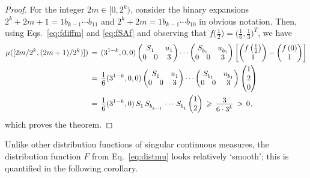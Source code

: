 \documentclass[11pt,a4paper]{amsart}
\theoremstyle{plain}
\theoremstyle{definition}
\numberwithin{equation}{section}
\newcommand{\ts}{\hspace{0.5pt}}
\newcommand{\myfrac}[2]{\frac{\raisebox{-2pt}{$#1$}}
      {\raisebox{0.5pt}{$#2$}}}
\begin{document}
\begin{proof}
For the integer $2m\in[0,2^{k})$, consider the binary expansions 
$2^k+2m+1=1b_{k-1}\cdots b_11$ and  $2^k+2m=1b_{k-1}\cdots
b_10$ in obvious notation. Then, using 
Eqs.~\eqref{eq:fdiffm} and \eqref{eq:fSAf} and
observing that $f \bigl( \frac{1}{2}\bigr) = \bigl(
\frac{1}{6}, \frac{1}{3} \bigr)^{T}$, we have
\begin{align*}
   \mu([2m/2^k, (2m+1)/2^k)]) \,
   &= \, (3^{1-k}, 0 , 0)\left(\begin{matrix} {S}^{}_{1} & 
   {u}^{}_{1}\\ 0\ \ \ 0 & 3 \end{matrix}\right)
   \cdots\left(\begin{matrix} {S}^{}_{b_{1}} & {u}^{}_{b_{1}}\\
    0\ \ \ 0 & 3 \end{matrix}\right)\left[\left(\begin{matrix}
    {f}\left(\frac{1}{2}\right)\\ 1\end{matrix}\right)-\left(
   \begin{matrix} {f}\left(0\right)\\ 1\end{matrix}\right)\right]\\
   &= \, \myfrac{1}{6}
   (3^{1-k}, 0 , 0)\left(\begin{matrix} {S}^{}_{1} & {u}^{}_{1}\\ 
   0\ \ \ 0 & 3 \end{matrix}\right)
   \cdots\left(\begin{matrix} {S}^{}_{b_{1}} & {u}^{}_{b_{1}}\\ 
   0\ \ \ 0 & 3\end{matrix}\right)\left(\begin{matrix}1 \\
    2 \\ 0\end{matrix}\right)\\
   &= \, \myfrac{1}{6}
   (3^{1-k}, 0)\, {S}^{}_{1}\, {S}^{}_{b^{}_{k-1}}\,\cdots\,
   {S}^{}_{b^{}_{1}}\left(\begin{matrix}1 \\ 2 \end{matrix}\right)
   \, \geqslant \, \myfrac{3}{6\cdot3^k} \, > \, 0 \ts ,
\end{align*} which proves the theorem.
\end{proof}

Unlike other distribution functions of singular continuous measures,
the distribution function $F$ from Eq.~\eqref{eq:distmu} looks
relatively `smooth'; this is quantified in the following corollary.
\end{document}
